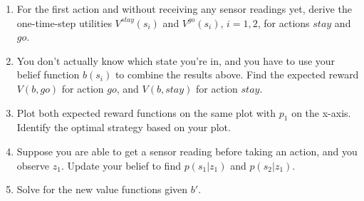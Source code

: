 \documentclass[12pt]{article}
\begin{document}
\begin{enumerate}

\item For the first action and without receiving any sensor readings
  yet, derive the one-time-step utilities $V^{stay}(s_i)$ and
  $V^{go}(s_i)$, $i=1,2$, for actions $stay$ and $go$.

\item You don't actually know which state you're in, and you have to
  use your belief function $b(s_i)$ to combine the results above.
  Find the expected reward $V(b,go)$ for action $go$, and $V(b,stay)$
  for action $stay$.

\item Plot both expected reward functions on the same plot with $p_1$
  on the x-axis.  Identify the optimal strategy based on your plot.

\item Suppose you are able to get a sensor reading before taking an
  action, and you observe $z_1$.  Update your belief to find $p(s_1 |
  z_1)$ and $p(s_2 | z_1)$.

\item Solve for the new value functions given $b'$.

\end{enumerate}
 
\end{document}
